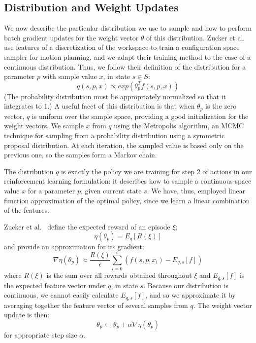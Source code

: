 \subsection{Distribution and Weight Updates}
We now describe the particular distribution we use to sample
and how to perform batch gradient updates for the weight vector $\theta$ of
this distribution. Zucker et al.~\cite{workspacebias} use features of a discretization of the workspace to train
a configuration space sampler for motion planning, and we adapt their training
method to the case of a continuous distribution. Thus, we follow their definition of
the distribution for a parameter $p$ with sample value $x$, in state $s \in S$: $$q(s, p, x) \propto exp(\theta_{p}^{T} f(s, p, x))$$
(The probability distribution must be appropriately normalized so
that it integrates to 1.) A useful facet of this distribution is
that when $\theta_{p}$ is the zero vector, $q$ is uniform over the
sample space, providing a good initialization for the weight
vectors. We sample $x$ from $q$ using the Metropolis algorithm,
an MCMC technique for sampling from a probability distribution using
a symmetric proposal distribution. At each iteration, the sampled value
is based only on the previous one, so the samples form a Markov chain.

The distribution $q$ is exactly the policy we are training for step 2 of actions in our
reinforcement learning formulation: it describes how to sample a continuous-space value $x$
for a parameter $p$, given current state $s$. We have, thus, employed linear function
approximation of the optimal policy, since we learn a linear combination of the features.

Zucker et al.~\cite{workspacebias} define the expected reward of an episode $\xi$:
$$\eta(\theta_{p}) = E_{q}[R(\xi)]$$ and provide an approximation for its gradient:
$$\nabla \eta(\theta_{p}) \approx \frac{R(\xi)}{\epsilon} \sum_{i=0}^{\epsilon}(f(s, p, x_{i}) - E_{q,s}[f])$$
where $R(\xi)$ is the sum over all rewards obtained throughout $\xi$ and
$E_{q,s}[f]$ is the expected feature vector under $q$, in state $s$. Because our distribution
is continuous, we cannot easily calculate $E_{q,s}[f]$, and so we approximate it by averaging
together the feature vector of several samples from $q$. The weight vector update is then:
$$\theta_{p} \leftarrow \theta_{p} + \alpha \nabla \eta(\theta_{p})$$
for appropriate step size $\alpha$.
